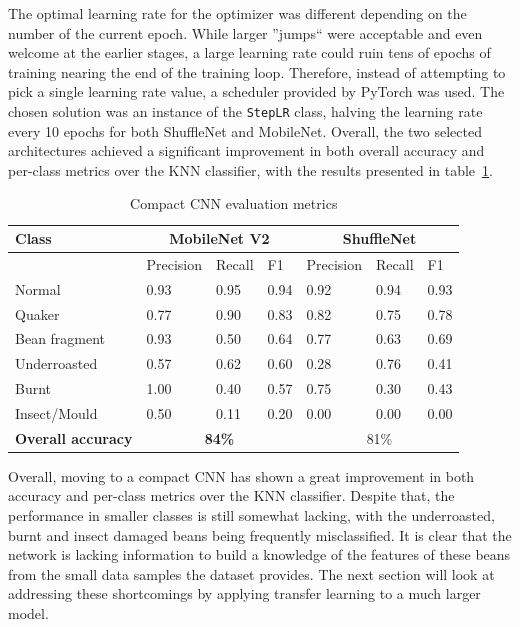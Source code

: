 The optimal learning rate for the optimizer was different depending on the number of the current epoch.
While larger ''jumps`` were acceptable and even welcome at the earlier stages, a large learning rate could ruin tens of epochs
of training nearing the end of the training loop.
Therefore, instead of attempting to pick a single learning rate value, a scheduler provided by PyTorch was used.
The chosen solution was an instance of the \verb|StepLR| class, halving the learning rate every 10 epochs for both
ShuffleNet and MobileNet.
Overall, the two selected architectures achieved a significant improvement in both overall accuracy and per-class
metrics over the KNN classifier, with the results presented in table~\ref{tab:cnn-small-scores}.

\begin{table}
    \centering
    \begin{tabular}{*7l}
        \toprule
        \textbf{Class} & \multicolumn{3}{c}{MobileNet V2} & \multicolumn{3}{c}{ShuffleNet} \\
        \midrule
        {}            & Precision & Recall & F1   & Precision & Recall & F1   \\
        Normal        & 0.93      & 0.95   & 0.94 & 0.92      & 0.94   & 0.93 \\
        Quaker        & 0.77      & 0.90   & 0.83 & 0.82      & 0.75   & 0.78 \\
        Bean fragment & 0.93      & 0.50   & 0.64 & 0.77      & 0.63   & 0.69 \\
        Underroasted  & 0.57      & 0.62   & 0.60 & 0.28      & 0.76   & 0.41 \\
        Burnt         & 1.00      & 0.40   & 0.57 & 0.75      & 0.30   & 0.43 \\
        Insect/Mould  & 0.50      & 0.11   & 0.20 & 0.00      & 0.00   & 0.00 \\
        \midrule
        \textbf{Overall accuracy} & \multicolumn{3}{c}{\textbf{84\%}} & \multicolumn{3}{c}{81\%} \\
        \bottomrule
    \end{tabular}
    \caption{Compact CNN evaluation metrics}
    \label{tab:cnn-small-scores}
\end{table}

Overall, moving to a compact CNN has shown a great improvement in both accuracy and per-class metrics over the KNN
classifier.
Despite that, the performance in smaller classes is still somewhat lacking, with the underroasted, burnt and insect damaged
beans being frequently misclassified.
It is clear that the network is lacking information to build a knowledge of the features of these beans from the small
data samples the dataset provides.
The next section will look at addressing these shortcomings by applying transfer learning to a much larger model.


